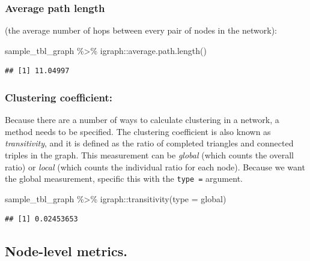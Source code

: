 \documentclass[
]{book}
\newenvironment{Shaded}{\begin{snugshade}}{\end{snugshade}}
\newcommand{\AttributeTok}[1]{\textcolor[rgb]{0.77,0.63,0.00}{#1}}
\newcommand{\FunctionTok}[1]{\textcolor[rgb]{0.00,0.00,0.00}{#1}}
\newcommand{\NormalTok}[1]{#1}
\newcommand{\SpecialCharTok}[1]{\textcolor[rgb]{0.00,0.00,0.00}{#1}}
\newcommand{\StringTok}[1]{\textcolor[rgb]{0.31,0.60,0.02}{#1}}
\begin{document}
\hypertarget{average-path-length-1}{%
\subsubsection{Average path length}\label{average-path-length-1}}

(the average number of hops between every pair of nodes in the network):

\begin{Shaded}
\begin{Highlighting}[]
\NormalTok{sample\_tbl\_graph }\SpecialCharTok{\%\textgreater{}\%}\NormalTok{ igraph}\SpecialCharTok{::}\FunctionTok{average.path.length}\NormalTok{()}
\end{Highlighting}
\end{Shaded}

\begin{verbatim}
## [1] 11.04997
\end{verbatim}

\hypertarget{clustering-coefficient-1}{%
\subsubsection{Clustering coefficient:}\label{clustering-coefficient-1}}

Because there are a number of ways to calculate clustering in a network, a method needs to be specified. The clustering coefficient is also known as \emph{transitivity}, and it is defined as the ratio of completed triangles and connected triples in the graph. This measurement can be \emph{global} (which counts the overall ratio) or \emph{local} (which counts the individual ratio for each node). Because we want the global measurement, specific this with the \texttt{type\ =} argument.

\begin{Shaded}
\begin{Highlighting}[]
\NormalTok{sample\_tbl\_graph }\SpecialCharTok{\%\textgreater{}\%}\NormalTok{ igraph}\SpecialCharTok{::}\FunctionTok{transitivity}\NormalTok{(}\AttributeTok{type =} \StringTok{\textquotesingle{}global\textquotesingle{}}\NormalTok{)}
\end{Highlighting}
\end{Shaded}

\begin{verbatim}
## [1] 0.02453653
\end{verbatim}

\hypertarget{node-level-metrics.}{%
\subsection{Node-level metrics.}\label{node-level-metrics.}}
\end{document}

